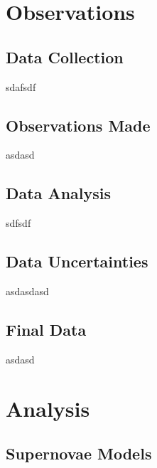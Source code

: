 \documentclass[twocolumn]{revtex4}
\begin{document}
\section{Observations} 
\vspace{-2ex}
\subsection{Data Collection}
\vspace{-2ex}

sdafsdf

\vspace{-3ex}
\subsection{Observations Made}
\vspace{-2ex}

asdasd

\vspace{-3ex}
\subsection{Data Analysis}
\vspace{-2ex}

sdfsdf

\vspace{-3ex}
\subsection{Data Uncertainties}
\vspace{-2ex}

asdasdasd

\vspace{-3ex}
\subsection{Final Data}
\vspace{-2ex}

asdasd

\vspace{-3ex}
\section{Analysis}
\vspace{-2ex}
\subsection{Supernovae Models}
\vspace{-2ex}
\end{document}
